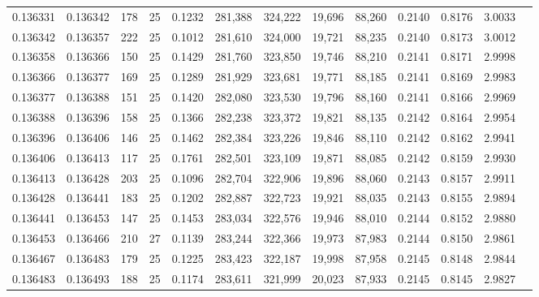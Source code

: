 \begin{tabular}{rrrrrrrrrrrrr}
0.136331 & 0.136342 &   178 &  25 &                                     0.1232 & 281,388 & 324,222 &  19,696 &  88,260 & 0.2140 & 0.8176 & 3.0033 \\
0.136342 & 0.136357 &   222 &  25 &                                     0.1012 & 281,610 & 324,000 &  19,721 &  88,235 & 0.2140 & 0.8173 & 3.0012 \\
0.136358 & 0.136366 &   150 &  25 &                                     0.1429 & 281,760 & 323,850 &  19,746 &  88,210 & 0.2141 & 0.8171 & 2.9998 \\
0.136366 & 0.136377 &   169 &  25 &                                     0.1289 & 281,929 & 323,681 &  19,771 &  88,185 & 0.2141 & 0.8169 & 2.9983 \\
0.136377 & 0.136388 &   151 &  25 &                                     0.1420 & 282,080 & 323,530 &  19,796 &  88,160 & 0.2141 & 0.8166 & 2.9969 \\
0.136388 & 0.136396 &   158 &  25 &                                     0.1366 & 282,238 & 323,372 &  19,821 &  88,135 & 0.2142 & 0.8164 & 2.9954 \\
0.136396 & 0.136406 &   146 &  25 &                                     0.1462 & 282,384 & 323,226 &  19,846 &  88,110 & 0.2142 & 0.8162 & 2.9941 \\
0.136406 & 0.136413 &   117 &  25 &                                     0.1761 & 282,501 & 323,109 &  19,871 &  88,085 & 0.2142 & 0.8159 & 2.9930 \\
0.136413 & 0.136428 &   203 &  25 &                                     0.1096 & 282,704 & 322,906 &  19,896 &  88,060 & 0.2143 & 0.8157 & 2.9911 \\
0.136428 & 0.136441 &   183 &  25 &                                     0.1202 & 282,887 & 322,723 &  19,921 &  88,035 & 0.2143 & 0.8155 & 2.9894 \\
0.136441 & 0.136453 &   147 &  25 &                                     0.1453 & 283,034 & 322,576 &  19,946 &  88,010 & 0.2144 & 0.8152 & 2.9880 \\
0.136453 & 0.136466 &   210 &  27 &                                     0.1139 & 283,244 & 322,366 &  19,973 &  87,983 & 0.2144 & 0.8150 & 2.9861 \\
0.136467 & 0.136483 &   179 &  25 &                                     0.1225 & 283,423 & 322,187 &  19,998 &  87,958 & 0.2145 & 0.8148 & 2.9844 \\
0.136483 & 0.136493 &   188 &  25 &                                     0.1174 & 283,611 & 321,999 &  20,023 &  87,933 & 0.2145 & 0.8145 & 2.9827 \\

\end{tabular}
